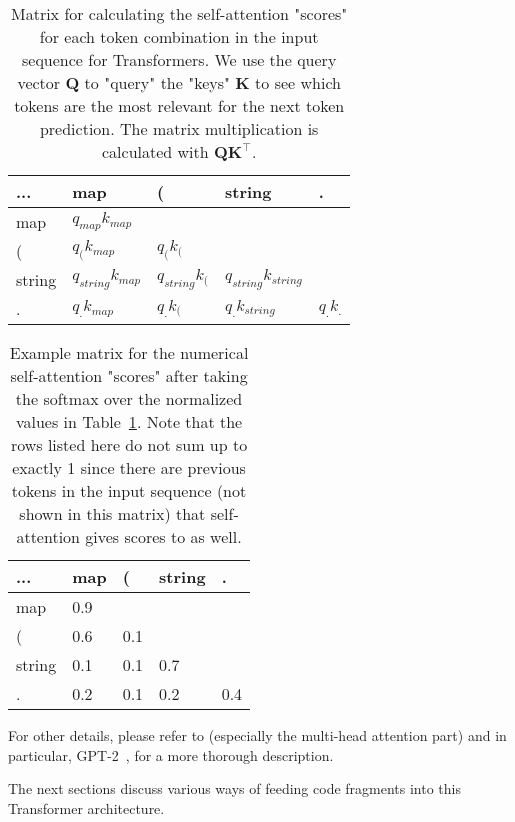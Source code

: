 \documentclass[nonacm, sigconf]{acmart}
\renewcommand{\vec}[1]{\boldsymbol{#1}}
\newcommand{\tabref}[1]{Table~\ref{#1}}
\begin{document}
\begin{table}
\centering
\begin{tabular}{|l|l|l|l|l|}  \hline
... & map  & ( & string & . \\ \hline
map    
    & $q_{map}k_{map}$ &&& \\ 
(      
    & $q_{(}k_{map}$ 
    & $q_{(}k_{(}$  && \\
string 
    & $q_{string}k_{map}$ 
    & $q_{string}k_{(}$  
    & $q_{string}k_{string}$ &  \\
.   
    & $q_{.}k_{map}$
    & $q_{.}k_{(}$  
    & $q_{.}k_{string}$      
    & $q_{.}k_{.}$ \\ 
\hline
\end{tabular}
\caption{Matrix for calculating the self-attention "scores" for each token combination in the input sequence for Transformers. We use the query vector $\vec{Q}$ to "query" the "keys" $\vec{K}$ to see which tokens are the most relevant for the next token prediction. The matrix multiplication is calculated with $\vec{Q}\vec{K}^\intercal$.}
\label{tab:QK}
\end{table}

\begin{table}
\centering
\begin{tabular}{|l|l|l|l|l|}  
\hline
... & map  & ( & string & . \\ \hline
map    & 0.9 &&& \\ 
(      & 0.6 & 0.1 && \\
string & 0.1   & 0.1  &  0.7  & \\
.      &  0.2     & 0.1  &  0.2  &  0.4 \\ \hline
\end{tabular}
\caption{Example matrix for the numerical self-attention "scores" after taking the softmax over the normalized values in \tabref{tab:QK}. Note that the rows listed here do not sum up to exactly 1 since there are previous tokens in the input sequence (not shown in this matrix) that self-attention gives scores to as well.}
\label{tab:QK_softmax}
\end{table}


For other details, please refer to \citet{vaswani2017attention} (especially the multi-head attention part) and in particular, GPT-2~\citep{radford2019language-gpt2}, for a more thorough description.

The next sections discuss various ways of feeding code fragments into this Transformer architecture.
\end{document}
